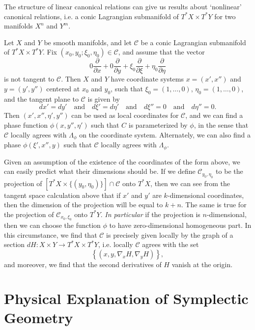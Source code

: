 The structure of linear canonical relations can give us results about `nonlinear' canonical relations, i.e. a conic Lagrangian submanifold of $T^* X \times T^* Y$ for two manifolds $X^n$ and $Y^m$.

\begin{lemma}
    Let $X$ and $Y$ be smooth manifolds, and let $\mathcal{C}$ be a conic Lagrangian submanifold of $T^* X \times T^* Y$. Fix $(x_0,y_0;\xi_0,\eta_0) \in \mathcal{C}$, and assume that the vector
    \[ 0 \frac{\partial}{\partial x} + 0 \frac{\partial}{\partial y} + \xi_0 \frac{\partial}{\partial \xi} + \eta_0 \frac{\partial}{\partial \eta} \]
    is not tangent to $\mathcal{C}$. Then $X$ and $Y$ have coordinate systems $x = (x',x'')$ and $y = (y',y'')$ centered at $x_0$ and $y_0$, such that $\xi_0 = (1,\dots,0)$, $\eta_0 = (1,\dots,0)$, and the tangent plane to $\mathcal{C}$ is given by
    \[ dx' = dy' \quad\text{and}\quad d\xi' = d\eta' \quad\text{and}\quad d\xi'' = 0 \quad\text{and}\quad d \eta'' = 0. \]
    Then $(x',x'',\eta',y'')$ can be used as local coordinates for $\mathcal{C}$, and we can find a phase function $\phi(x,y'',\eta')$ such that $C$ is parameterized by $\phi$, in the sense that $\mathcal{C}$ locally agrees with $\Lambda_\phi$ on the coordinate system. Alternately, we can also find a phase $\phi(\xi',x'',y)$ such that $\mathcal{C}$ locally agrees with $\Lambda_\phi$.
\end{lemma}

Given an assumption of the existence of the coordinates of the form above, we can easily predict what their dimensions should be. If we define $\mathcal{C}_{y_0,\eta_0}$ to be the projection of $[T^* X \times \{ (y_0,\eta_0) \}] \cap \mathcal{C}$ onto $T^* X$, then we can see from the tangent space calculation above that if $x'$ and $y'$ are $k$-dimensional coordinates, then the dimension of the projection will be equal to $k + n$. The same is true for the projection of $\mathcal{C}_{x_0,\xi_0}$ onto $T^* Y$. \emph{In particular} if the projection is $n$-dimensional, then we can choose the function $\phi$ to have zero-dimensional homogeneous part. In this circumstance, we find that $\mathcal{C}$ is precisely given locally by the graph of a section $dH: X \times Y \to T^* X \times T^* Y$, i.e. locally $\mathcal{C}$ agrees with the set
%
\[ \left\{ \left(x,y, \nabla_x H, \nabla_y H \right) \right\}, \]
%
and moreover, we find that the second derivatives of $H$ vanish at the origin.

\section{Physical Explanation of Symplectic Geometry}


